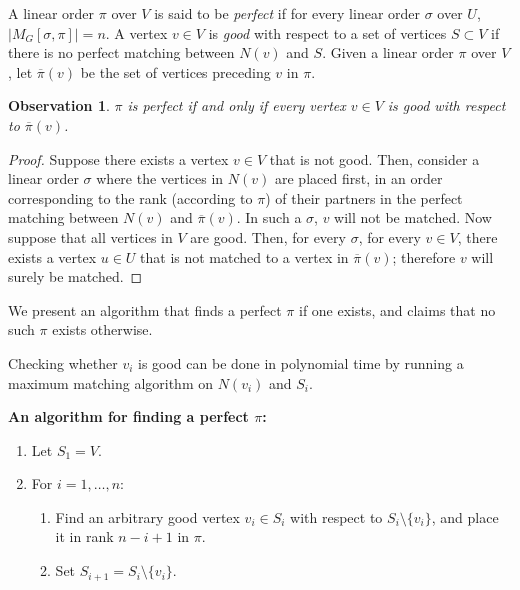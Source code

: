 \documentclass[11pt]{article}
\numberwithin{equation}{section}
\theoremstyle{definition}
\theoremstyle{plain}
\theoremstyle{plain}
\newtheorem{observation}[theorem]{Observation}
\newcommand{\precvpi}{\overline{\pi}(v)}
\begin{document}
%

A linear order $\pi$ over $V$ is said to be \emph{perfect} if for every linear order $\sigma$ over $U$, $|M_G[\sigma,\pi]| = n$.
A vertex $v \in V$ is \emph{good} with respect to a set of vertices $S \subset V$ if there is no perfect matching between $N(v)$ and $S$.
Given a linear order $\pi$ over $V$, let $\precvpi$ be the set of vertices preceding $v$ in $\pi$.

\begin{observation}
	\label{obs:perfect-pi}
	$\pi$ is perfect if and only if every vertex $v \in V$ is good with respect to $\precvpi$.
\end{observation}
\begin{proof}
	Suppose there exists a vertex $v \in V$ that is not good. Then, consider a linear order $\sigma$ where the vertices in $N(v)$ are placed first, in an order corresponding to the rank (according to $\pi$) of their partners in the perfect matching between $N(v)$ and $\precvpi$. In such a $\sigma$, $v$ will not be matched.
	Now suppose that all vertices in $V$ are good.
	Then, for every $\sigma$, for every $v \in V$, there exists a vertex $u \in U$ that is not matched to a vertex in $\precvpi$; therefore $v$ will surely be matched.	
\end{proof}


We present an algorithm that finds a perfect $\pi$ if one exists, and claims that no such $\pi$ exists otherwise.

Checking whether $v_i$ is good can be done in polynomial time by running a maximum matching algorithm on $N(v_i)$ and $S_i$.

\medskip
\noindent\textbf{An algorithm for finding a perfect $\pi$:}
\begin{enumerate}
	\item Let $S_1=V$.
%
%
\item For $i=1,\ldots,n$:    %
	\begin{enumerate}
		\item Find an arbitrary good vertex $v_i \in S_i$ with respect to $S_i \setminus \{v_i\}$, and place it in rank $n-i+1$ in $\pi$.
		\item Set $S_{i+1}=S_i \setminus \{v_i\}$.
	\end{enumerate}
\end{enumerate}
\end{document}
